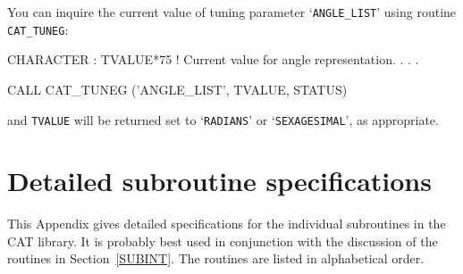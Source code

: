 \documentclass[11pt,twoside]{starlink}
\begin{document}
You can inquire the current value of tuning parameter `\texttt{ANGLE\_LIST}' using routine \texttt{CAT\_TUNEG}:

\begin{terminalv}
     CHARACTER
    :  TVALUE*75   ! Current value for angle representation.
      .
      .
      .


     CALL CAT_TUNEG ('ANGLE_LIST', TVALUE, STATUS)
\end{terminalv}

and \texttt{TVALUE} will be returned set to `\texttt{RADIANS}' or
`\texttt{SEXAGESIMAL}', as appropriate.


\cleardoublepage
\appendix
\section{\label{DETAIL}Detailed subroutine specifications}

This Appendix gives detailed specifications for the individual
subroutines in the CAT library.  It is probably best used in conjunction
with the discussion of the routines in Section~\ref{SUBINT}. The
routines are listed in alphabetical order.
\end{document}
